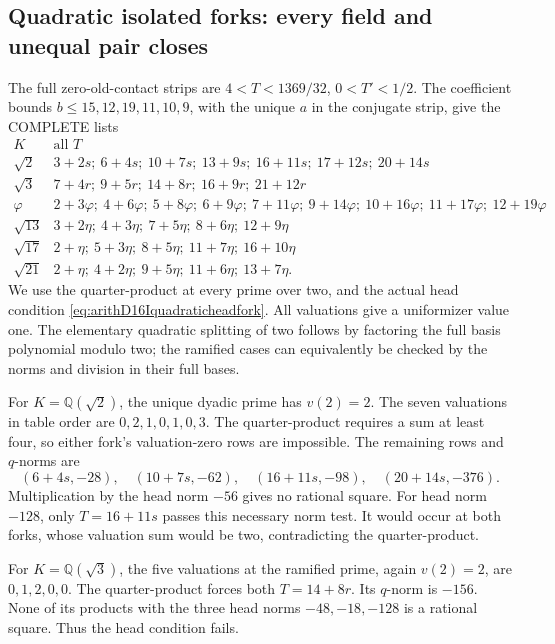 \documentclass[11pt]{article}
\begin{document}
\subsection{Quadratic isolated forks: every field and unequal pair closes}
\label{app:arithD16Iquadraticfinish}

The full zero-old-contact strips are
\(4<T<1369/32\), \(0<T'<1/2\).
The coefficient bounds
\(b\le15,12,19,11,10,9\), with the
unique \(a\) in the conjugate strip,
give the COMPLETE lists
\[
\begin{array}{c|l}
 K&\text{all }T\\ \hline
 \sqrt2&3+2s;\ 6+4s;\ 10+7s;\ 13+9s;\
                      16+11s;\ 17+12s;\ 20+14s\\
 \sqrt3&7+4r;\ 9+5r;\ 14+8r;\ 16+9r;\ 21+12r\\
 \varphi&2+3\varphi;\ 4+6\varphi;\ 5+8\varphi;\
  6+9\varphi;\ 7+11\varphi;\ 9+14\varphi;\
  10+16\varphi;\ 11+17\varphi;\ 12+19\varphi\\
 \sqrt{13}&3+2\eta;\ 4+3\eta;\ 7+5\eta;\ 8+6\eta;\ 12+9\eta\\
 \sqrt{17}&2+\eta;\ 5+3\eta;\ 8+5\eta;\ 11+7\eta;\ 16+10\eta\\
 \sqrt{21}&2+\eta;\ 4+2\eta;\ 9+5\eta;\ 11+6\eta;\ 13+7\eta .
\end{array}
\]
We use the quarter-product at every
prime over two, and the actual head
condition
\eqref{eq:arithD16Iquadraticheadfork}.
All valuations give a uniformizer
value one.
The elementary quadratic splitting
of two follows by factoring the full
basis polynomial modulo two;
the ramified cases can equivalently
be checked by the norms and division
in their full bases.

For \(K=\mathbb Q(\sqrt2)\), the
unique dyadic prime has \(v(2)=2\).
The seven valuations in table order
are \(0,2,1,0,1,0,3\).
The quarter-product requires a sum
at least four, so either fork's
valuation-zero rows are impossible.
The remaining rows and \(q\)-norms
are
\[
       (6+4s,-28),\quad(10+7s,-62),\quad
                     (16+11s,-98),\quad(20+14s,-376).
\]
Multiplication by the head norm
\(-56\) gives no rational square.
For head norm \(-128\), only
\(T=16+11s\) passes this necessary
norm test.
It would occur at both forks,
whose valuation sum would be two,
contradicting the quarter-product.

For \(K=\mathbb Q(\sqrt3)\), the
five valuations at the ramified
prime, again \(v(2)=2\), are
\(0,1,2,0,0\).
The quarter-product forces both
\(T=14+8r\).
Its \(q\)-norm is \(-156\).
None of its products with the three
head norms \(-48,-18,-128\) is a
rational square.
Thus the head condition fails.
\end{document}
